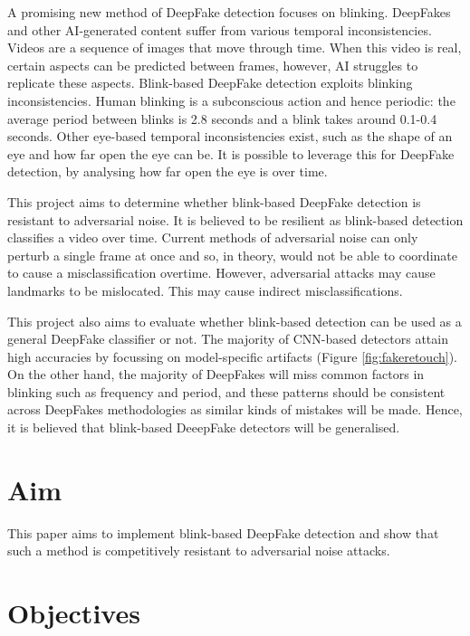 A promising new method of DeepFake detection focuses on blinking. DeepFakes and other AI-generated content suffer from various temporal inconsistencies. Videos are a sequence of images that move through time. When this video is real, certain aspects can be predicted between frames, however, AI struggles to replicate these aspects. Blink-based DeepFake detection exploits blinking inconsistencies. Human blinking is a subconscious action and hence periodic: the average period between blinks is 2.8 seconds and a blink takes around 0.1-0.4 seconds\cite{schiffman1990sensation}. Other eye-based temporal inconsistencies exist, such as the shape of an eye and how far open the eye can be. It is possible to leverage this for DeepFake detection, by analysing how far open the eye is over time.

This project aims to determine whether blink-based DeepFake detection is resistant to adversarial noise. It is believed to be resilient as blink-based detection classifies a video over time. Current methods of adversarial noise can only perturb a single frame at once and so, in theory, would not be able to coordinate to cause a misclassification overtime. However, adversarial attacks may cause landmarks to be mislocated. This may cause indirect misclassifications. 

This project also aims to evaluate whether blink-based detection can be used as a general DeepFake classifier or not. The majority of CNN-based detectors attain high accuracies by focussing on model-specific artifacts (Figure \ref{fig:fakeretouch}). On the other hand, the majority of DeepFakes will miss common factors in blinking such as frequency and period, and these patterns should be consistent across DeepFakes methodologies as similar kinds of mistakes will be made. Hence, it is believed that blink-based DeeepFake detectors will be generalised.

\section{Aim}
\label{sec:aim}

This paper aims to implement blink-based DeepFake detection and show that such a method is competitively resistant to adversarial noise attacks.

\section{Objectives}
\label{sec:objectives}

